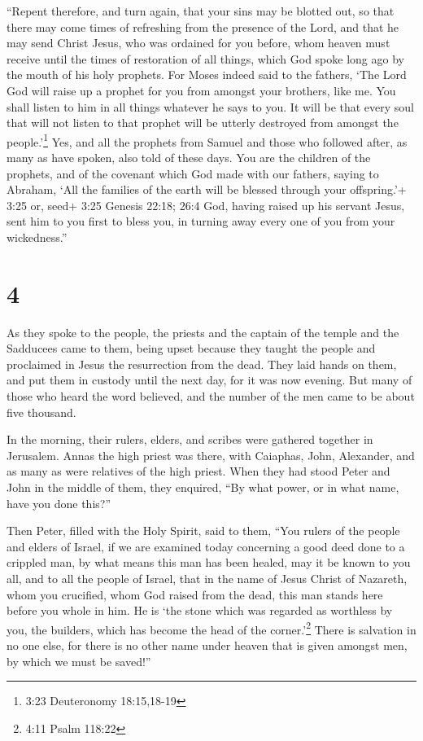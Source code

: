  ``Repent therefore, and turn again, that your sins may be
blotted out, so that there may come times of refreshing from the
presence of the Lord,  and that he may send Christ Jesus,
who was ordained for you before,  whom heaven must receive
until the times of restoration of all things, which God spoke long ago
by the mouth of his holy prophets.  For Moses indeed said
to the fathers, `The Lord God will raise up a prophet for you from
amongst your brothers, like me. You shall listen to him in all things
whatever he says to you.  It will be that every soul that
will not listen to that prophet will be utterly destroyed from amongst
the people.'\footnote{3:23 Deuteronomy 18:15,18-19}  Yes,
and all the prophets from Samuel and those who followed after, as many
as have spoken, also told of these days.  You are the
children of the prophets, and of the covenant which God made with our
fathers, saying to Abraham, `All the families of the earth will be
blessed through your offspring.'+ 3:25 or, seed+ 3:25 Genesis 22:18;
26:4  God, having raised up his servant Jesus, sent him to
you first to bless you, in turning away every one of you from your
wickedness.''

\hypertarget{section-3}{%
\section{4}\label{section-3}}

 As they spoke to the people, the priests and the captain of
the temple and the Sadducees came to them,  being upset
because they taught the people and proclaimed in Jesus the resurrection
from the dead.  They laid hands on them, and put them in
custody until the next day, for it was now evening.  But
many of those who heard the word believed, and the number of the men
came to be about five thousand.

 In the morning, their rulers, elders, and scribes were
gathered together in Jerusalem.  Annas the high priest was
there, with Caiaphas, John, Alexander, and as many as were relatives of
the high priest.  When they had stood Peter and John in the
middle of them, they enquired, ``By what power, or in what name, have
you done this?''

 Then Peter, filled with the Holy Spirit, said to them,
``You rulers of the people and elders of Israel,  if we are
examined today concerning a good deed done to a crippled man, by what
means this man has been healed,  may it be known to you
all, and to all the people of Israel, that in the name of Jesus Christ
of Nazareth, whom you crucified, whom God raised from the dead, this man
stands here before you whole in him.  He is `the stone
which was regarded as worthless by you, the builders, which has become
the head of the corner.'\footnote{4:11 Psalm 118:22}  There
is salvation in no one else, for there is no other name under heaven
that is given amongst men, by which we must be saved!''

